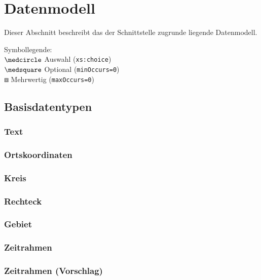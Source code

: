 \chapter{Datenmodell}
\label{sec:Datenmodell}
Dieser Abschnitt beschreibt das der Schnittstelle zugrunde liegende Datenmodell. \medskip

\noindent Symbollegende:\\
$\medcircle$ Auswahl (\verb|xs:choice|)\\
$\medsquare$ Optional (\verb|minOccurs=0|)\\
$\boxbox$ Mehrwertig (\verb|maxOccurs=0|)\\


\section{Basisdatentypen}
\label{subsec:Datenmodell:Basis}

\subsection*{Text}


\subsection*{Ortskoordinaten}


\subsection*{Kreis}


\subsection*{Rechteck}


\subsection*{Gebiet}


\subsection*{Zeitrahmen}


\subsection*{Zeitrahmen (Vorschlag)}



